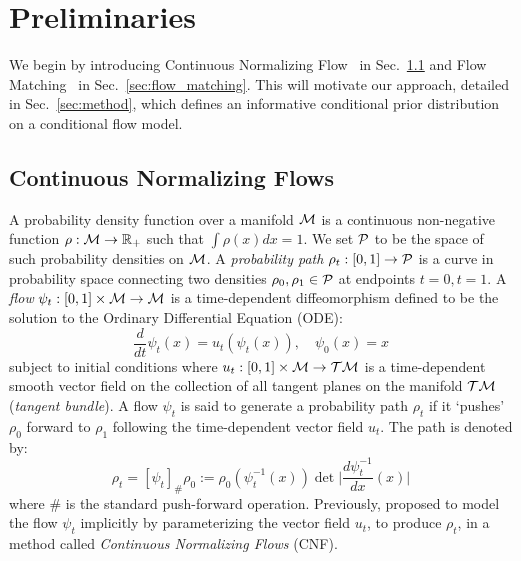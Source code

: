 \section{Preliminaries}
We begin by introducing Continuous Normalizing Flow~\cite{chen2019neural} in Sec.~\ref{sec:probability_paths} and Flow Matching~\cite{lipman2022flow} in Sec.~\ref{sec:flow_matching}. This will motivate our approach, detailed in Sec.~\ref{sec:method}, which defines an
informative conditional prior distribution on a conditional flow model. 

\subsection{Continuous Normalizing Flows}
\label{sec:probability_paths}

A probability density function over a manifold ${\mathcal{M}}$ is a continuous non-negative function $\rho: {\mathcal{M}}\rightarrow\mathbb{R}_+$ such that $\int \rho(x)dx = 1$. We set ${\mathcal{P}}$ to be the space of such probability densities on ${\mathcal{M}}$. A \emph{probability path} $\rho_t: [0,1]\rightarrow{\mathcal{P}}$ is a curve in probability space connecting two densities $\rho_0,\rho_1 \in {\mathcal{P}}$ at endpoints $t=0, t=1$. A \emph{flow} $\psi_t: [0,1] \times {\mathcal{M}} \to {\mathcal{M}}$ is a time-dependent diffeomorphism defined to be the solution to the Ordinary Differential Equation (ODE):
\begin{equation}\label{eq_ode_cnf}
    \frac{d}{dt} \psi_t(x) = u_t \left(\psi_t(x) \right), \quad \psi_0(x) = x
\end{equation}
subject to initial conditions where $u_t: [0,1] \times {\mathcal{M}} \to {\mathcal{T}}{\mathcal{M}}$ is a time-dependent smooth vector field on the collection of all tangent planes on the manifold  ${\mathcal{T}}{\mathcal{M}}$ (\emph{tangent bundle}). A flow $\psi_t$ is said to generate a probability path $\rho_t$ if it `pushes' $\rho_0$ forward to $\rho_1$ following the time-dependent vector field $u_t$. The path is denoted by:
\begin{equation}
    \rho_t = [\psi_t]_\#\rho_0 := \rho_0(\psi_{t}^{-1}(x))\det \Big|\frac{d\psi_{t}^{-1}}{dx}(x)\Big|
\end{equation}
where $\#$ is the standard push-forward operation. Previously, \citep{chen2019neural} proposed to model the flow $\psi_t$ implicitly by parameterizing the vector field $u_t$, to produce $\rho_t$, in a method called \emph{Continuous Normalizing Flows} (CNF).

